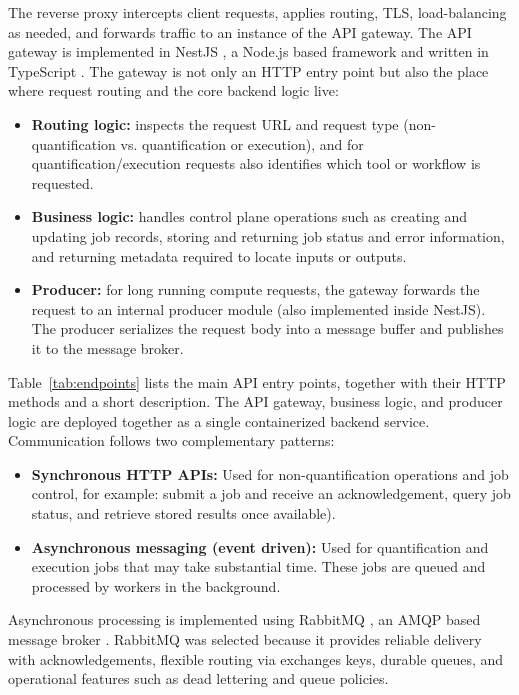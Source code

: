 The reverse proxy intercepts client requests, applies routing, TLS, load-balancing as needed, and forwards traffic to an instance of the API gateway. The API gateway is implemented in NestJS \cite{noauthor_documentation_nodate}, a Node.js \cite{Node} based framework and written in TypeScript \cite{starting}.
The gateway is not only an HTTP entry point but also the place where request routing and the core backend logic live:
\begin{itemize}
    \item \textbf{Routing logic:} inspects the request URL and request type (non-quantification vs. quantification or execution), and for quantification/execution requests also identifies which tool or workflow is requested.
    \item \textbf{Business logic:} handles control plane operations such as creating and updating job records, storing and returning job status and error information, and returning metadata required to locate inputs or outputs.
    \item \textbf{Producer:} for long running compute requests, the gateway forwards the request to an internal producer module (also implemented inside NestJS). The producer serializes the request body into a message buffer and publishes it to the message broker.
\end{itemize}
Table~\ref{tab:endpoints} lists the main API entry points, together with their HTTP methods and a short description. The API gateway, business logic, and producer logic are deployed together as a single containerized backend service. Communication follows two complementary patterns:
\begin{itemize}
    \item \textbf{Synchronous HTTP APIs:} Used for non-quantification operations and job control, for example: submit a job and receive an acknowledgement, query job status, and retrieve stored results once available).
    \item \textbf{Asynchronous messaging (event driven):} Used for quantification and execution jobs that may take substantial time. These jobs are queued and processed by workers in the background.
\end{itemize}



Asynchronous processing is implemented using RabbitMQ \cite{RabbitMQ}, an AMQP based message broker \cite{enwiki:1297038479}. RabbitMQ was selected because it provides reliable delivery with acknowledgements, flexible routing via exchanges  keys, durable queues, and operational features such as dead lettering and queue policies.

